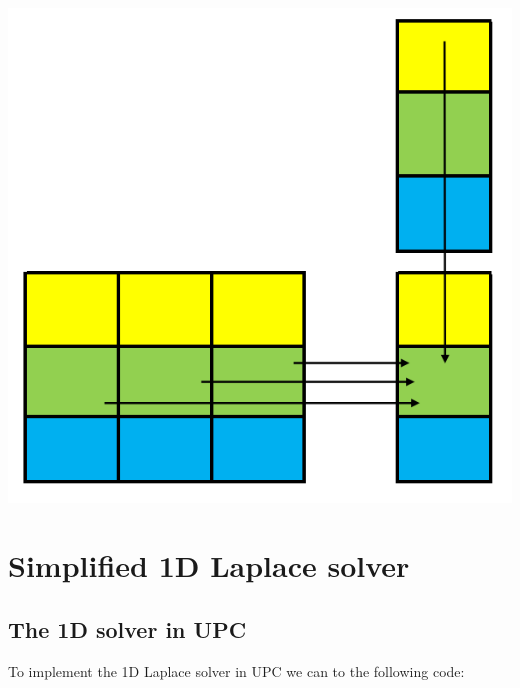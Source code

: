 \documentclass{report}
\begin{document}
\begin{center}
    \includegraphics[scale=0.5]{Images/Matrix_vector_optimized.png}
    \label{fig2}
\end{center}

\chapter{Simplified 1D Laplace solver}

\section{The 1D solver in UPC}

To implement the 1D Laplace solver in UPC we can to the following code:
\end{document}
